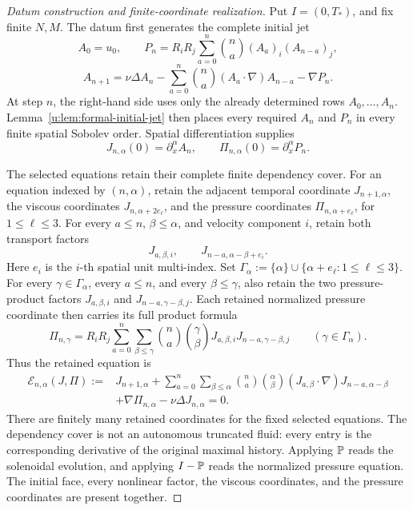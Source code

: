 \begin{proof}[Datum construction and finite-coordinate realization]
Put \(I=(0,T_*)\), and fix finite \(N,M\).  The datum first generates the
complete initial jet
\[
 A_0=u_0,
 \qquad
 P_n=R_iR_j\sum_{a=0}^n\binom na(A_a)_i(A_{n-a})_j,
\]
\[
 A_{n+1}=\nu\Delta A_n
 -\sum_{a=0}^n\binom na(A_a\cdot\nabla)A_{n-a}-\nabla P_n.
\]
At step \(n\), the right-hand side uses only the already determined rows
\(A_0,\ldots,A_n\).  Lemma~\ref{u:lem:formal-initial-jet} then places
every required \(A_n\) and \(P_n\) in every finite spatial Sobolev order.
Spatial differentiation supplies
\[
 J_{n,\alpha}(0)=\partial_x^\alpha A_n,
 \qquad
 \Pi_{n,\alpha}(0)=\partial_x^\alpha P_n.
\]

The selected equations retain their complete finite dependency cover.  For
an equation indexed by \((n,\alpha)\), retain the adjacent temporal coordinate
\(J_{n+1,\alpha}\), the viscous coordinates
\(J_{n,\alpha+2e_\ell}\), and the pressure coordinates
\(\Pi_{n,\alpha+e_\ell}\), for \(1\le\ell\le3\).  For every \(a\le n\),
\(\beta\le\alpha\), and velocity component \(i\), retain both transport
factors
\[
 J_{a,\beta,i},
 \qquad
 J_{n-a,\alpha-\beta+e_i}.
\]
Here \(e_i\) is the \(i\)-th spatial unit multi-index.  Set
\(\Gamma_\alpha:=\{\alpha\}\cup\{\alpha+e_\ell:1\le\ell\le3\}\).
For every \(\gamma\in\Gamma_\alpha\), every \(a\le n\), and every
\(\beta\le\gamma\), also retain the two pressure-product factors
\(J_{a,\beta,i}\) and \(J_{n-a,\gamma-\beta,j}\).  Each retained normalized
pressure coordinate then carries its full product formula
\[
 \Pi_{n,\gamma}
 =R_iR_j\sum_{a=0}^n\sum_{\beta\le\gamma}
 \binom na\binom{\gamma}{\beta}
 J_{a,\beta,i}J_{n-a,\gamma-\beta,j}
 \qquad(\gamma\in\Gamma_\alpha).
\]
Thus the retained equation is
\begin{equation}
 \begin{aligned}
 \mathscr E_{n,\alpha}(J,\Pi):={}&J_{n+1,\alpha}
 +\sum_{a=0}^{n}\sum_{\beta\le\alpha}
 \binom na\binom{\alpha}{\beta}
 (J_{a,\beta}\cdot\nabla)J_{n-a,\alpha-\beta}\\
 &+\nabla\Pi_{n,\alpha}-\nu\Delta J_{n,\alpha}=0.
 \end{aligned}
 \label{u:eq:finite-equation-graph}
\end{equation}
There are finitely many retained coordinates for the fixed selected equations.
The dependency cover is not an autonomous truncated fluid: every entry is the
corresponding derivative of the original maximal history.  Applying \(\mathbb P\)
reads the solenoidal evolution, and applying \(I-\mathbb P\) reads the normalized
pressure equation.  The initial face, every nonlinear factor, the viscous
coordinates, and the pressure coordinates are present together.


\end{proof}
